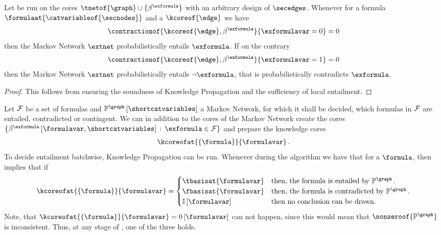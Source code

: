 \begin{corollary}
    \label{cor:knowledgePropagationMarkovNetworks}
    Let  be run on the cores $\tnetof{\graph}\cup\{\bencodingof{\exformula}\}$ with an arbitrary design of $\secedges$.
    Whenever for a formula $\formulaat{\catvariableof{\secnodes}}$ and a $\kcoreof{\edge}$ we have
    \[ \contractionof{\kcoreof{\edge},\bencodingof{\exformula}}{\exformulavar=0} =0  \]
    then the Markov Network $\extnet$ probabilistically entails $\exformula$.
    If on the contrary
    \[ \contractionof{\kcoreof{\edge},\bencodingof{\exformula}}{\exformulavar=1} =0  \]
    then the Markov Network $\extnet$ probabilistically entails $\lnot\exformula$, that is probabilistically contradicts $\exformula$.
\end{corollary}
\begin{proof}
    This follows from  ensuring the soundness of Knowledge Propagation and the sufficiency of local entailment.
\end{proof}

\begin{example}
    Let $\mathcal{F}$ be a set of formulas and $\probofat{\graph}{\shortcatvariables}$ a Markov Network, for which it shall be decided, which formulas in $\mathcal{F}$ are entailed, contradicted or contingent.
    We can in addition to the cores of the Markov Network create the cores $\{\bencodingofat{\exformula}{\formulavar,\shortcatvariables} \wcols \exformula\in\formulaset\}$ and prepare the knowledge cores
    \begin{align*}
        \kcoreofat{\{\formula\}}{\formulavar} \, .
    \end{align*}
    To decide entailment batchwise, Knowledge Propagation  can be run.
    Whenever during the algorithm we have that for a $\formula$, then  implies that if
    \begin{align*}
        \kcoreofat{\{\formula\}}{\formulavar} =
        \begin{cases}
            \tbasisat{\formulavar} & \text{then, the formula is entailed by }\probof{\graph} \, . \\
            \fbasisat{\formulavar} & \text{then, the formula is contradicted by }\probof{\graph} \, .\\
            \onesat{\formulavar} & \text{then no conclusion can be drawn.}
        \end{cases}
    \end{align*}
    Note, that $\kcoreofat{\{\formula\}}{\formulavar} = \zerosat{\formulavar}$ can not happen, since this would mean that $\nonzeroof{\probof{\graph}}$ is inconsistent.
    Thus, at any stage of , one of the three holds.
\end{example}


